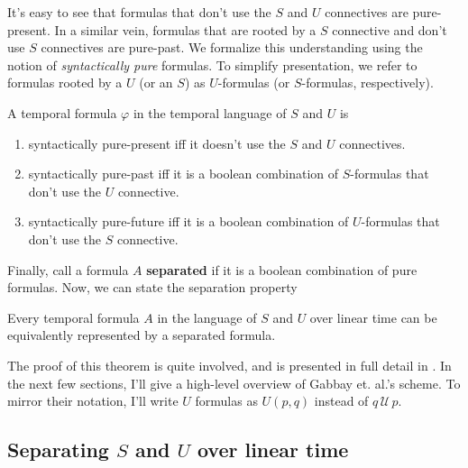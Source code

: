 \documentclass[a4paper,UKenglish,cleveref, autoref, thm-restate, numberwithinsect]{lipics-v2021}
\begin{document}
It's easy to see that formulas that don't use the $S$ and $U$ connectives are pure-present. In a similar vein, formulas that are rooted by a $S$ connective and don't use $S$ connectives are pure-past. We formalize this understanding using the notion of \textit{syntactically pure} formulas. To simplify presentation, we refer to formulas rooted by a $U$ (or an $S$) as $U$-formulas (or $S$-formulas, respectively).
\begin{definition}
    A temporal formula $\varphi$ in the temporal language of $S$ and $U$ is
    \begin{enumerate}
        \item syntactically pure-present iff it doesn't use the $S$ and $U$ connectives.
        \item syntactically pure-past iff it is a boolean combination of $S$-formulas that don't use the $U$ connective.
        \item syntactically pure-future iff it is a boolean combination of $U$-formulas that don't use the $S$ connective.
    \end{enumerate}
\end{definition}

Finally, call a formula $A$ \textbf{separated} if it is a boolean combination of pure formulas. Now, we can state the separation property
\begin{theorem}
    \label{theorem:separation-property-linear-time}
    Every temporal formula $A$ in the language of $S$ and $U$ over linear time can be equivalently represented by a separated formula.
\end{theorem}

The proof of this theorem is quite involved, and is presented in full detail in \cite{gabbay1994}. In the next few sections, I'll give a high-level overview of Gabbay et. al.'s scheme. To mirror their notation, I'll write $U$ formulas as $U(p, q)$ instead of $q \,\mathcal{U}\, p$.

\subsection{Separating $S$ and $U$ over linear time}
\end{document}
